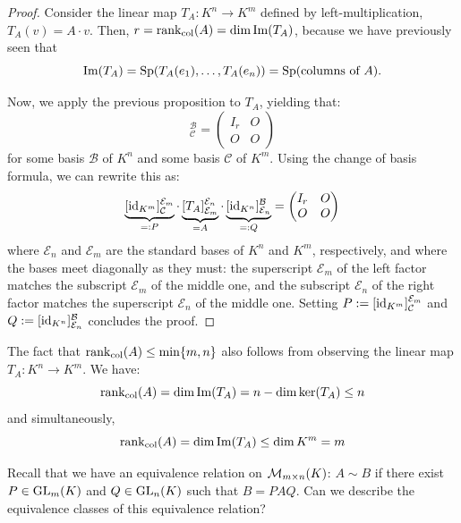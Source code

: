 \begin{proof}
Consider the linear map $T_A: K^n \to K^m$ defined by left-multiplication, $T_A(v) = A \cdot v$. Then, $r = \operatorname{rank}_{\text{col}}(A) = \dim \operatorname{Im}(T_A)$, because we have previously seen that 
\[\operatorname{Im}(T_A) = \operatorname{Sp}(T_A(e_1), \dots, T_A(e_n)) = \operatorname{Sp}(\text{columns of } A).\]

Now, we apply the previous proposition to $T_A$, yielding that:
\begin{equation*}
    [T_A]_{\mathcal{C}}^{\mathcal{B}} = \begin{pmatrix} I_r & O \\ O & O \end{pmatrix}
\end{equation*}
for some basis $\mathcal{B}$ of $K^n$ and some basis $\mathcal{C}$ of $K^m$. Using the change of basis formula, we can rewrite this as:
\begin{equation*}
    \underbrace{[\operatorname{id}_{K^m}]_{\mathcal{C}}^{\mathcal{E}_m}}_{=: P} \cdot \underbrace{[T_A]_{\mathcal{E}_m}^{\mathcal{E}_n}}_{= A} \cdot \underbrace{[\operatorname{id}_{K^n}]_{\mathcal{E}_n}^{\mathcal{B}}}_{=: Q} = \begin{pmatrix} I_r & O \\ O & O \end{pmatrix}
\end{equation*}
where $\mathcal{E}_n$ and $\mathcal{E}_m$ are the standard bases of $K^n$ and $K^m$, respectively, and where the bases meet diagonally as they must: the superscript $\mathcal{E}_m$ of the left factor matches the subscript $\mathcal{E}_m$ of the middle one, and the subscript $\mathcal{E}_n$ of the right factor matches the superscript $\mathcal{E}_n$ of the middle one. Setting $P := [\operatorname{id}_{K^m}]_{\mathcal{C}}^{\mathcal{E}_m}$ and $Q := [\operatorname{id}_{K^n}]_{\mathcal{E}_n}^{\mathcal{B}}$ concludes the proof.
\end{proof}

\begin{remark}
The fact that $\operatorname{rank}_{\text{col}}(A) \le \min\{m, n\}$ also follows from observing the linear map $T_A: K^n \to K^m$. We have:
\begin{equation*}
    \operatorname{rank}_{\text{col}}(A) = \dim \operatorname{Im}(T_A) = n - \dim \ker(T_A) \le n
\end{equation*}
and simultaneously,
\begin{equation*}
    \operatorname{rank}_{\text{col}}(A) = \dim \operatorname{Im}(T_A) \le \dim K^m = m
\end{equation*}
\end{remark}

\begin{question}
Recall that we have an equivalence relation on $\mathcal{M}_{m \times n}(K)$: $A \sim B$ if there exist $P \in \operatorname{GL}_m(K)$ and $Q \in \operatorname{GL}_n(K)$ such that $B = PAQ$. Can we describe the equivalence classes of this equivalence relation?
\end{question}

